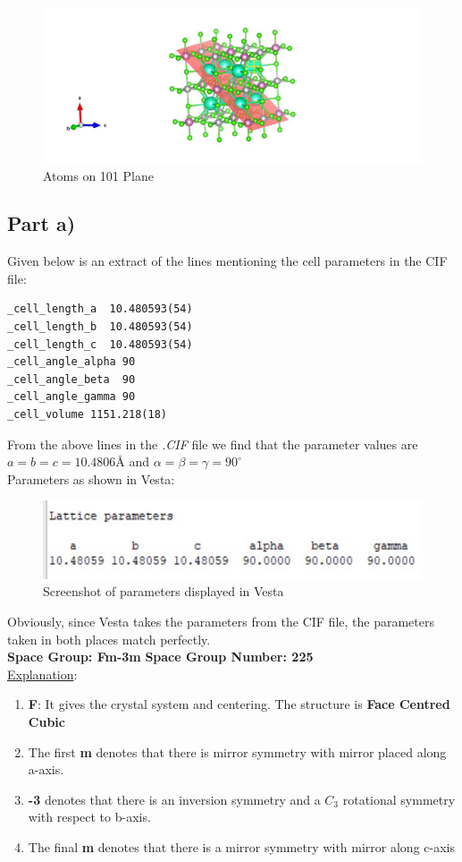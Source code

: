 \documentclass{homework}
\begin{document}
\FloatBarrier
\begin{figure}[!h]
\centering
\includegraphics[width=1\textwidth]{q1part_i_101.jpg}
\caption{Atoms on 101 Plane}
\label{101}
\end{figure}
\FloatBarrier

\exercise
\subsection*{Part a)}
Given below is an extract of the lines mentioning the cell parameters in the CIF file:
\begin{lstlisting}
_cell_length_a  10.480593(54)
_cell_length_b  10.480593(54)
_cell_length_c  10.480593(54)
_cell_angle_alpha 90
_cell_angle_beta  90
_cell_angle_gamma 90
_cell_volume 1151.218(18)
\end{lstlisting}
From the above lines in the \textit{.CIF} file we find that the parameter values are $a = b = c = 10.4806$\AA{}  and $\alpha = \beta = \gamma = 90^{\circ}$
\\
Parameters as shown in Vesta:
\begin{figure}[!h]
\centering
\includegraphics[width=1\textwidth]{vesta_params.jpg}
\caption{Screenshot of parameters displayed in Vesta}
\end{figure}
\FloatBarrier
Obviously, since Vesta takes the parameters from the CIF file, the parameters taken in both places match perfectly.
\\
\textbf{Space Group: Fm-3m} \tab \textbf{Space Group Number: 225}
\\
\underline{Explanation}:
\begin{enumerate}
    \item \textbf{F}: It gives the crystal system and centering. The structure is \textbf{Face Centred Cubic}
    \item The first \textbf{m} denotes that there is mirror symmetry with mirror placed along a-axis.
    \item \textbf{-3} denotes that there is an inversion symmetry and a $C_3$ rotational symmetry with respect to b-axis.
    \item The final \textbf{m} denotes that there is a mirror symmetry with mirror along c-axis
\end{enumerate}
\end{document}
